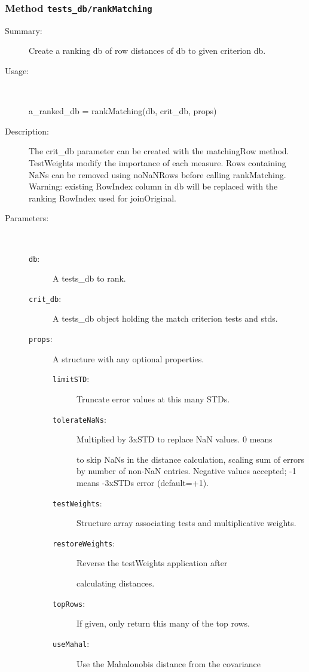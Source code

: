 \subsubsection[Method \texttt{rankMatching}]{Method \texttt{tests\_db/rankMatching}}%
%
\label{ref_tests_db__rankMatching}%
\hypertarget{ref_tests_db__rankMatching}{}%
\begin{description}
\item[Summary:]Create a ranking db of row distances of db to given criterion db.
%
\item[Usage:]~%
\begin{lyxcode}%
a\_ranked\_db = rankMatching(db, crit\_db, props)
%
\end{lyxcode}%
%
\item[Description:]%
The crit\_db parameter can be created with the matchingRow
 method. TestWeights modify the importance of each measure. Rows containing
 NaNs can be removed using noNaNRows before calling rankMatching. 
 Warning: existing RowIndex column in db will be replaced with the
 ranking RowIndex used for joinOriginal.
\item[Parameters:]~
\begin{description}%
\item[\texttt{db}:]
 A tests\_db to rank.
\item[\texttt{crit\_db}:]
 A tests\_db object holding the match criterion tests and stds.
\item[\texttt{props}:]
 A structure with any optional properties.
\begin{description}%
\item[\texttt{limitSTD}:]
 Truncate error values at this many STDs.
\item[\texttt{tolerateNaNs}:]
 Multiplied by 3xSTD to replace NaN values. 0 means

to skip NaNs in the distance calculation, scaling sum of
errors by number of non-NaN entries. Negative values
accepted; -1 means -3xSTDs error (default=+1).
\item[\texttt{testWeights}:]
 Structure array associating tests and multiplicative weights.
\item[\texttt{restoreWeights}:]
 Reverse the testWeights application after

calculating distances.
\item[\texttt{topRows}:]
 If given, only return this many of the top rows.
\item[\texttt{useMahal}:]
 Use the Mahalonobis distance from the covariance


\end{description}
\end{description}
\end{description}
